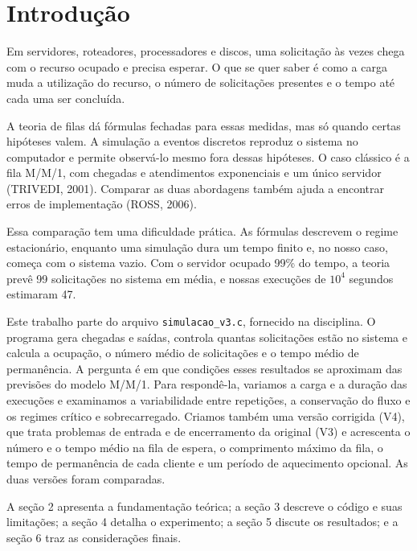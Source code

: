 \documentclass[
  article,      %
  10pt,         %
  oneside,
  a4paper,
  twocolumn,    %
  english,
  brazil        %
]{abntex2}
\begin{document}
\section{Introdução}

Em servidores, roteadores, processadores e discos, uma solicitação às vezes chega com o recurso ocupado e precisa esperar. O que se quer saber é como a carga muda a utilização do recurso, o número de solicitações presentes e o tempo até cada uma ser concluída.

A teoria de filas dá fórmulas fechadas para essas medidas, mas só quando certas hipóteses valem. A simulação a eventos discretos reproduz o sistema no computador e permite observá-lo mesmo fora dessas hipóteses. O caso clássico é a fila M/M/1, com chegadas e atendimentos exponenciais e um único servidor (TRIVEDI, 2001). Comparar as duas abordagens também ajuda a encontrar erros de implementação (ROSS, 2006).

Essa comparação tem uma dificuldade prática. As fórmulas descrevem o regime estacionário, enquanto uma simulação dura um tempo finito e, no nosso caso, começa com o sistema vazio. Com o servidor ocupado 99\% do tempo, a teoria prevê 99 solicitações no sistema em média, e nossas execuções de $10^4$ segundos estimaram 47.

Este trabalho parte do arquivo \texttt{simulacao\_v3.c}, fornecido na disciplina. O programa gera chegadas e saídas, controla quantas solicitações estão no sistema e calcula a ocupação, o número médio de solicitações e o tempo médio de permanência. A pergunta é em que condições esses resultados se aproximam das previsões do modelo M/M/1. Para respondê-la, variamos a carga e a duração das execuções e examinamos a variabilidade entre repetições, a conservação do fluxo e os regimes crítico e sobrecarregado. Criamos também uma versão corrigida (V4), que trata problemas de entrada e de encerramento da original (V3) e acrescenta o número e o tempo médio na fila de espera, o comprimento máximo da fila, o tempo de permanência de cada cliente e um período de aquecimento opcional. As duas versões foram comparadas.

A seção 2 apresenta a fundamentação teórica; a seção 3 descreve o código e suas limitações; a seção 4 detalha o experimento; a seção 5 discute os resultados; e a seção 6 traz as considerações finais.

\end{document}
